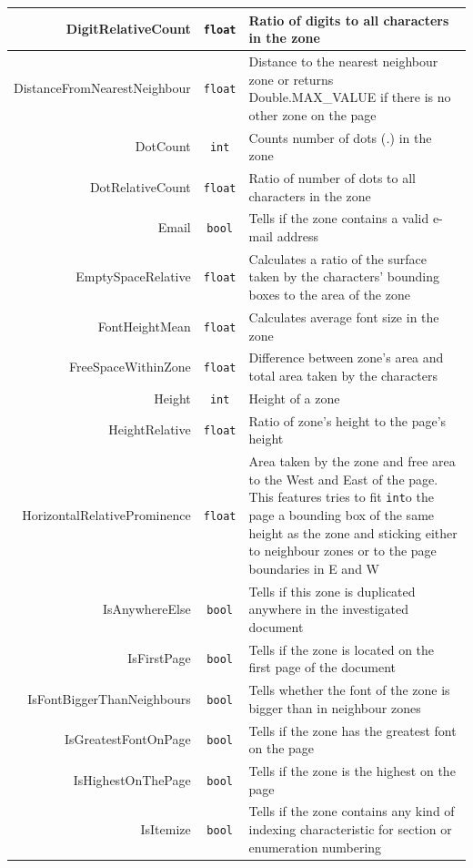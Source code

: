 \begin{appendix}
\begin{longtable}[c]{|r|c|p{8cm}|}
DigitRelativeCount & \verb+float+ & Ratio of digits to all characters in the zone \\ \hline
DistanceFromNearestNeighbour & \verb+float+ & Distance to the nearest neighbour zone or returns Double.MAX\_VALUE if there is no other zone on the page\\ \hline
DotCount & \verb+int+ & Counts number of dots (\textit{.}) in the zone\\ \hline
DotRelativeCount & \verb+float+ & Ratio of number of dots to all characters in the zone \\ \hline
Email & \verb+bool+ & Tells if the zone contains a valid e-mail address\\ \hline
EmptySpaceRelative & \verb+float+ & Calculates a ratio of the surface taken by the characters' bounding boxes to the area of the zone \\ \hline
FontHeightMean & \verb+float+ & Calculates average font size in the zone \\ \hline
FreeSpaceWithinZone & \verb+float+ & Difference between zone's area and total area taken by the characters\\ \hline
Height & \verb+int+ & Height of a zone\\ \hline
HeightRelative & \verb+float+ & Ratio of zone's height to the page's height\\ \hline
HorizontalRelativeProminence & \verb+float+ & Area taken by the zone and free area to the West and East of the page. This features tries to fit \verb+int+o the page a bounding box of the same height as the zone and sticking either to neighbour zones or to the page boundaries in E and W\\ \hline
IsAnywhereElse & \verb+bool+ & Tells if this zone is duplicated anywhere in the investigated document \\ \hline
IsFirstPage & \verb+bool+ & Tells if the zone is located on the first page of the document \\ \hline
IsFontBiggerThanNeighbours & \verb+bool+ & Tells whether the font of the zone is bigger than in neighbour zones\\ \hline
IsGreatestFontOnPage & \verb+bool+ & Tells if the zone has the greatest font on the page \\ \hline
IsHighestOnThePage & \verb+bool+ & Tells if the zone is the highest on the page \\ \hline
IsItemize & \verb+bool+ & Tells if the zone contains any kind of indexing characteristic for section or enumeration numbering \\ \hline

\end{longtable}
\end{appendix}
